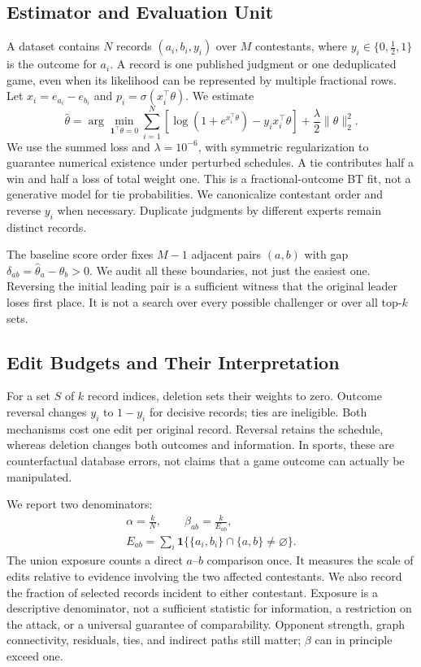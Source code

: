 \documentclass{article}
\newcommand{\sigmoid}{\sigma}
\begin{document}
\subsection{Estimator and Evaluation Unit}
A dataset contains $N$ records $(a_i,b_i,y_i)$ over $M$ contestants, where $y_i\in\{0,\frac12,1\}$ is the outcome for $a_i$. A record is one published judgment or one deduplicated game, even when its likelihood can be represented by multiple fractional rows. Let $x_i=e_{a_i}-e_{b_i}$ and $p_i=\sigmoid(x_i^\top\theta)$. We estimate
\begin{equation}
\widehat\theta=\arg\min_{\mathbf1^\top\theta=0}
\sum_{i=1}^{N}\left[\log(1+e^{x_i^\top\theta})-y_ix_i^\top\theta\right]
+\frac\lambda2\|\theta\|_2^2.
\label{eq:bt}
\end{equation}
We use the summed loss and $\lambda=10^{-6}$, with symmetric regularization to guarantee numerical existence under perturbed schedules. A tie contributes half a win and half a loss of total weight one. This is a fractional-outcome BT fit, not a generative model for tie probabilities. We canonicalize contestant order and reverse $y_i$ when necessary. Duplicate judgments by different experts remain distinct records.

The baseline score order fixes $M-1$ adjacent pairs $(a,b)$ with gap $\delta_{ab}=\widehat\theta_a-\widehat\theta_b>0$. We audit all these boundaries, not just the easiest one. Reversing the initial leading pair is a sufficient witness that the original leader loses first place. It is not a search over every possible challenger or over all top-$k$ sets.

\subsection{Edit Budgets and Their Interpretation}
For a set $S$ of $k$ record indices, deletion sets their weights to zero. Outcome reversal changes $y_i$ to $1-y_i$ for decisive records; ties are ineligible. Both mechanisms cost one edit per original record. Reversal retains the schedule, whereas deletion changes both outcomes and information. In sports, these are counterfactual database errors, not claims that a game outcome can actually be manipulated.

We report two denominators:
\begin{equation}
\begin{gathered}
\alpha=\frac{k}{N},\qquad \beta_{ab}=\frac{k}{E_{ab}},\\
E_{ab}=\sum_i\mathbf1\{\{a_i,b_i\}\cap\{a,b\}\ne\varnothing\}.
\end{gathered}
\label{eq:budgets}
\end{equation}
The union exposure counts a direct $a$--$b$ comparison once. It measures the scale of edits relative to evidence involving the two affected contestants. We also record the fraction of selected records incident to either contestant. Exposure is a descriptive denominator, not a sufficient statistic for information, a restriction on the attack, or a universal guarantee of comparability. Opponent strength, graph connectivity, residuals, ties, and indirect paths still matter; $\beta$ can in principle exceed one.
\end{document}
